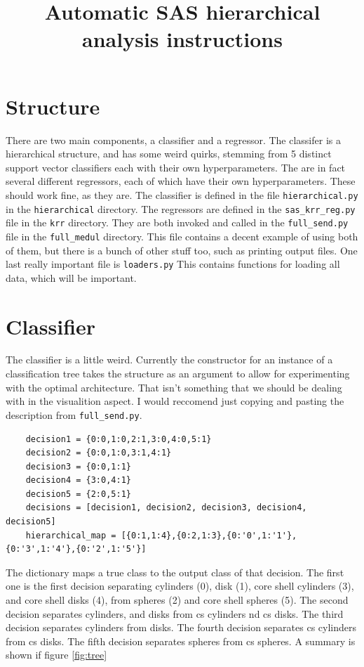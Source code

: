 \documentclass{article}
\title{Automatic SAS hierarchical analysis instructions}
\begin{document}
\maketitle
\section{Structure}
There are two main components, a classifier and a regressor.
The classifer is a hierarchical structure, and has some weird quirks, stemming from 5 distinct support vector classifiers each with their own hyperparameters.
The are in fact several different regressors, each of which have their own hyperparameters.
These should work fine, as they are.
The classifier is defined in the file \texttt{hierarchical.py} in the \texttt{hierarchical} directory.
The regressors are defined in the \texttt{sas\_krr\_reg.py} file in the \texttt{krr} directory.
They are both invoked and called in the \texttt{full\_send.py} file in the \texttt{full\_medul} directory.
This file contains a decent example of using both of them, but there is a bunch of other stuff too, such as printing output files.
One last really important file is \texttt{loaders.py} This contains functions for loading all data, which will be important.

\section{Classifier}
The classifier is a little weird. Currently the constructor for an instance of a classification tree takes the structure as an argument to allow for experimenting with the optimal architecture. That isn't something that we should be dealing with in the visualition aspect. I would reccomend just copying and pasting the description from \texttt{full\_send.py}.
\begin{verbatim}
    decision1 = {0:0,1:0,2:1,3:0,4:0,5:1}
    decision2 = {0:0,1:0,3:1,4:1}
    decision3 = {0:0,1:1}
    decision4 = {3:0,4:1}
    decision5 = {2:0,5:1}
    decisions = [decision1, decision2, decision3, decision4, decision5]
    hierarchical_map = [{0:1,1:4},{0:2,1:3},{0:'0',1:'1'},{0:'3',1:'4'},{0:'2',1:'5'}]
\end{verbatim}
The dictionary maps a true class to the output class of that decision. 
The first one is the first decision separating cylinders (0), disk (1), core shell cylinders (3), and core shell disks (4), from spheres (2) and core shell spheres (5).
The second decision separates cylinders, and disks from cs cylinders nd cs disks.
The third decision separates cylinders from disks.
The fourth decision separates cs cylinders from cs disks.
The fifth decision separates spheres from cs spheres.
A summary is shown if figure \ref{fig:tree}
\end{document}
